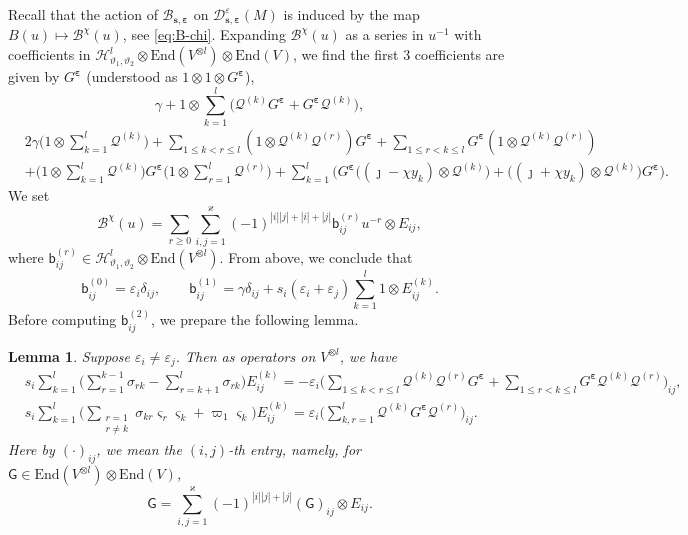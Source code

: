 \documentclass[11pt,reqno]{amsart}
\numberwithin{equation}{section}
\newtheorem{lem}[thm]{Lemma}
\theoremstyle{definition}
\theoremstyle{remark}
\newcommand{\beq}{\begin{equation}}
\newcommand{\eeq}{\end{equation}}
\newcommand{\mc}{\mathcal}
\newcommand{\sfb}{\mathsf{b}}
\newcommand{\End}{\mathrm{End}}
\newcommand{\gge}{\geqslant}
\newcommand{\lle}{\leqslant}
\newcommand{\BMN}{{\mathscr{B}_{\bm s,\bm \ve}}}
\newcommand{\ka}{\varkappa}
\newcommand{\ve}{\varepsilon}
\newcommand{\s}{{\bm s}}
\begin{document}
Recall that the action of $\BMN$ on $\mc D_{\s,\bm\ve}^\ve(M)$ is induced by the map $B(u)\mapsto \mc B^\chi(u)$, see \eqref{eq:B-chi}. Expanding $\mc B^\chi(u)$ as a series in $u^{-1}$ with coefficients in $\mathscr H_{\vartheta_1,\vartheta_2}^l\otimes \End(V^{\otimes l})\otimes \End(V)$, we find the first 3 coefficients are given by $G^{\bm \ve}$ (understood as $1\otimes 1\otimes G^{\bm \ve}$),
$$
\gamma+1\otimes \sum_{k=1}^l \big(\mc Q^{(k)}G^{\bm \ve}+G^{\bm \ve}\mc Q^{(k)}\big),
$$
\beq\label{eq:B-matrix-2nd}
\begin{split}
& 2\gamma\Big(1\otimes\sum_{k=1}^l \mc Q^{(k)}\Big)+\sum_{1\lle k<r\lle l}(1\otimes \mc Q^{(k)}\mc Q^{(r)})G^{\bm \ve}+\sum_{1\lle r<k\lle l}G^{\bm \ve}(1\otimes \mc Q^{(k)}\mc Q^{(r)})\\
& +\Big(1\otimes\sum_{k=1}^l \mc Q^{(k)}\Big)G^{\bm \ve}\Big(1\otimes\sum_{r=1}^l \mc Q^{(r)}\Big)+\sum_{k=1}^l\Big( G^{\bm \ve}\big((\jmath-\chi y_k)\otimes  \mc Q^{(k)}\big)+\big((\jmath+\chi y_k)\otimes  \mc Q^{(k)}\big)G^{\bm \ve}\Big).
\end{split}
\eeq
We set
$$
\mc B^{\chi}(u)=\sum_{r \gge 0 }\sum_{i,j=1}^\ka (-1)^{|i||j|+|i|+|j|}\sfb_{ij}^{(r)}u^{-r}\otimes E_{ij},
$$
where $\sfb_{ij}^{(r)}\in \mathscr H_{\vartheta_1,\vartheta_2}^l \otimes \End(V^{\otimes l})$. From above, we conclude that
\[
\sfb_{ij}^{(0)}=\ve_i\delta_{ij},\qquad \sfb_{ij}^{(1)}=\gamma\delta_{ij}+s_i(\ve_i+\ve_j)\sum_{k=1}^l 1\otimes E_{ij}^{(k)}.
\]
Before computing $\sfb_{ij}^{(2)}$, we prepare the following lemma.
\begin{lem}\label{lem:drinfeld-cal}
Suppose $\ve_i\ne \ve_j$. Then as operators on $V^{\otimes l}$, we have
\begin{align}
&s_i\sum_{k=1}^l\Big(\sum_{r=1}^{k-1}\sigma_{rk}-\sum_{r=k+1}^{l}\sigma_{rk}\Big)E_{ij}^{(k)}=-\ve_i\Big(\sum_{1\lle k<r\lle l}\mc Q^{(k)}\mc Q^{(r)}G^{\bm\ve}+\sum_{1\lle r<k\lle l}G^{\bm\ve}\mc Q^{(k)}\mc Q^{(r)}\Big)_{ij},\label{eq:lem-bij2-1}\\
&s_i\sum_{k=1}^l\Big(\sum_{\substack{r=1\\ r\ne k}}\sigma_{kr}\varsigma_r\varsigma_k+\varpi_1\varsigma_k\Big)E_{ij}^{(k)}=\ve_i\Big(\sum_{k,r=1}^l\mc Q^{(k)}G^{\bm\ve}\mc Q^{(r)}\Big)_{ij}.\label{eq:lembij2-2}
\end{align}
Here by $(\cdot)_{ij}$, we mean the $(i,j)$-th entry, namely, for $\mathsf G\in \End(V^{\otimes l})\otimes \End(V)$, $$\mathsf G=\sum_{i,j=1}^\ka (-1)^{|i||j|+|j|}(\mathsf G)_{ij}\otimes E_{ij}.$$
\end{lem}
\end{document}
